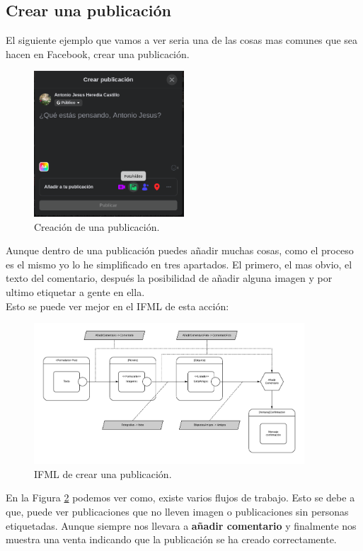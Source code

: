\documentclass[12pt,a4paper]{article}
\begin{document}
\subsection{Crear una publicación}
El siguiente ejemplo que vamos a ver seria una de las cosas mas comunes que sea hacen en Facebook, crear una publicación. 
\begin{figure}[H]
	\centering
	\includegraphics[width=0.5\textwidth]{images/capturas/escribirComentario.png}
	\caption{Creación de una publicación. }
	\label{fig:post}	
\end{figure}
Aunque dentro de una publicación puedes añadir muchas cosas, como el proceso es el mismo yo lo he simplificado en tres apartados. El primero, el mas obvio, el texto del comentario, después la posibilidad de añadir alguna imagen y por ultimo etiquetar a gente en ella. \\
Esto se puede ver mejor en el IFML de esta acción:
\begin{figure}[H]
	\centering
	\includegraphics[width=0.9\textwidth]{images/ifml/aniadirImagen.png}
	\caption{IFML de crear una publicación. }
	\label{fig:ifmlpublicacion}	
\end{figure}
En la Figura \ref{fig:ifmlpublicacion} podemos ver como, existe varios flujos de trabajo. Esto se debe a que, puede ver publicaciones que no lleven imagen o publicaciones sin personas etiquetadas. Aunque siempre nos llevara a \textbf{añadir comentario} y finalmente nos muestra una venta indicando que la publicación se ha creado correctamente. 
\end{document}
